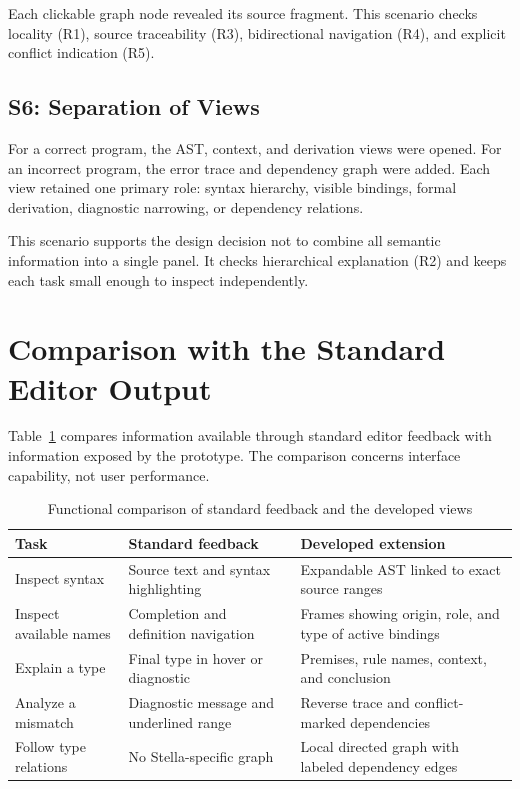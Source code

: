 Each clickable graph node revealed its source fragment. This scenario checks locality (R1), source traceability (R3), bidirectional navigation (R4), and explicit conflict indication (R5).

\subsection{S6: Separation of Views}

For a correct program, the AST, context, and derivation views were opened. For an incorrect program, the error trace and dependency graph were added. Each view retained one primary role: syntax hierarchy, visible bindings, formal derivation, diagnostic narrowing, or dependency relations.

This scenario supports the design decision not to combine all semantic information into a single panel. It checks hierarchical explanation (R2) and keeps each task small enough to inspect independently.

\section{Comparison with the Standard Editor Output}

Table~\ref{tab:baseline-comparison} compares information available through standard editor feedback with information exposed by the prototype. The comparison concerns interface capability, not user performance.

\begin{table}[htbp]
\centering
\caption{Functional comparison of standard feedback and the developed views}
\label{tab:baseline-comparison}
\begin{tabular}{p{3.5cm}p{4.7cm}p{5.2cm}}
\toprule
\textbf{Task} & \textbf{Standard feedback} & \textbf{Developed extension} \\
\midrule
Inspect syntax & Source text and syntax highlighting & Expandable AST linked to exact source ranges \\
Inspect available names & Completion and definition navigation & Frames showing origin, role, and type of active bindings \\
Explain a type & Final type in hover or diagnostic & Premises, rule names, context, and conclusion \\
Analyze a mismatch & Diagnostic message and underlined range & Reverse trace and conflict-marked dependencies \\
Follow type relations & No Stella-specific graph & Local directed graph with labeled dependency edges \\
\bottomrule
\end{tabular}
\end{table}

